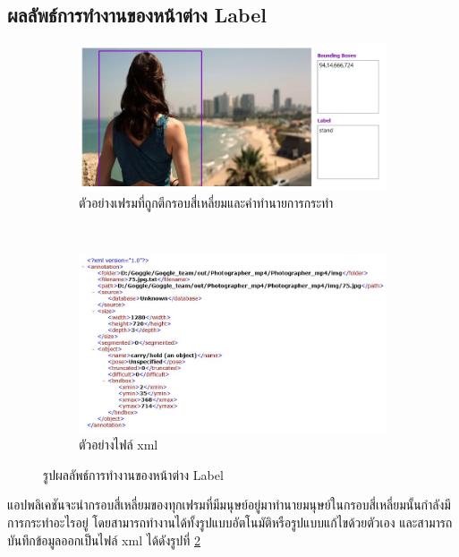 \subsection*{ผลลัพธ์การทำงานของหน้าต่าง Label}
\begin{figure}[!ht]
    \centering
   \begin{subfigure}[b]{0.65\linewidth}
      \includegraphics[width=\linewidth]{chapter4/images/Result/result_select.jpg}
      \caption{ตัวอย่างเฟรมที่ถูกตีกรอบสี่เหลี่ยมและคำทำนายการกระทำ}
      \label{fig:result_labeled}
    \end{subfigure}
\\
    \begin{subfigure}[b]{0.8\linewidth}
      \includegraphics[width=\linewidth]{chapter4/images/Result/result_select9.jpg}
      \caption{ตัวอย่างไฟล์ xml}
      \label{fig:result_label_xml}
    \end{subfigure}
    \caption{รูปผลลัพธ์การทำงานของหน้าต่าง Label}
    \label{fig:result_label}
  \end{figure}
แอปพลิเคชันจะนำกรอบสี่เหลี่ยมของทุกเฟรมที่มีมนุษย์อยู่มาทำนายมนุษย์ในกรอบสี่เหลี่ยมนั้นกำลังมีการกระทำอะไรอยู่ โดยสามารถทำงานได้ทั้งรูปแบบอัตโนมัติหรือรูปแบบแก้ไขด้วยตัวเอง
และสามารถบันทึกข้อมูลออกเป็นไฟล์ xml ได้ดังรูปที่ \ref{fig:result_label_xml}
